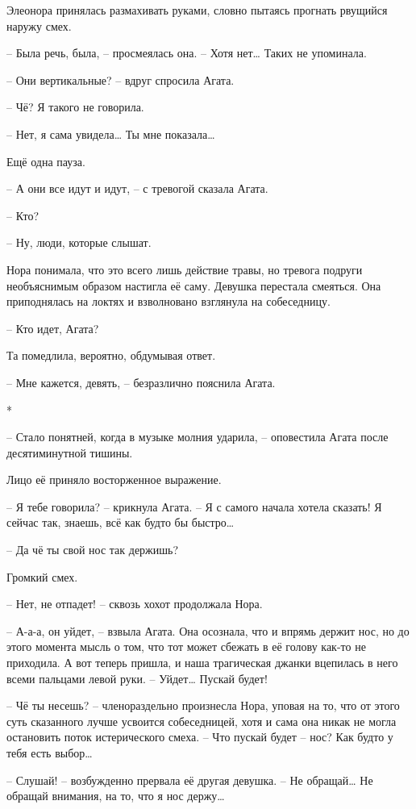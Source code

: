\documentclass[
  a5paperpaper,
  DIV=11,
  numbers=noendperiod]{scrreprt}
\begin{document}
Элеонора принялась размахивать руками, словно пытаясь прогнать рвущийся
наружу смех.

-- Была речь, была, -- просмеялась она. -- Хотя нет\ldots{} Таких не
упоминала.

-- Они вертикальные? -- вдруг спросила Агата.

-- Чё? Я такого не говорила.

-- Нет, я сама увидела\ldots{} Ты мне показала\ldots{}

Ещё одна пауза.

-- А они все идут и идут, -- с тревогой сказала Агата.

-- Кто?

-- Ну, люди, которые слышат.

Нора понимала, что это всего лишь действие травы, но тревога подруги
необъяснимым образом настигла её саму. Девушка перестала смеяться. Она
приподнялась на локтях и взволновано взглянула на собеседницу.

-- Кто идет, Агата?

Та помедлила, вероятно, обдумывая ответ.

-- Мне кажется, девять, -- безразлично пояснила Агата.

*

-- Стало понятней, когда в музыке молния ударила, -- оповестила Агата
после десятиминутной тишины.

Лицо её приняло восторженное выражение.

-- Я тебе говорила? -- крикнула Агата. -- Я с самого начала хотела
сказать! Я сейчас так, знаешь, всё как будто бы быстро\ldots{}

-- Да чё ты свой нос так держишь?

Громкий смех.

-- Нет, не отпадет! -- сквозь хохот продолжала Нора.

-- А-а-а, он уйдет, -- взвыла Агата. Она осознала, что и впрямь держит
нос, но до этого момента мысль о том, что тот может сбежать в её голову
как-то не приходила. А вот теперь пришла, и наша трагическая джанки
вцепилась в него всеми пальцами левой руки. -- Уйдет\ldots{} Пускай
будет!

-- Чё ты несешь? -- членораздельно произнесла Нора, уповая на то, что от
этого суть сказанного лучше усвоится собеседницей, хотя и сама она никак
не могла остановить поток истерического смеха. -- Что пускай будет --
нос? Как будто у тебя есть выбор\ldots{}

-- Слушай! -- возбужденно прервала её другая девушка. -- Не
обращай\ldots{} Не обращай внимания, на то, что я нос держу\ldots{}
\end{document}
